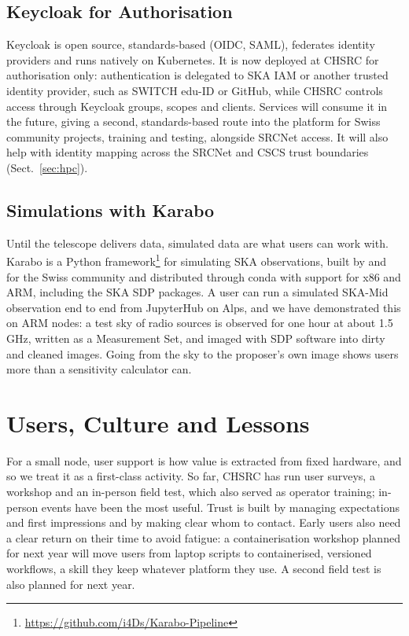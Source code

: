 \documentclass[11pt,twoside]{article}
\begin{document}
\subsection{Keycloak for Authorisation}
Keycloak is open source, standards-based (OIDC, SAML), federates identity providers and runs natively on Kubernetes. It is now deployed at CHSRC for authorisation only: authentication is delegated to SKA IAM or another trusted identity provider, such as SWITCH edu-ID or GitHub, while CHSRC controls access through Keycloak groups, scopes and clients. Services will consume it in the future, giving a second, standards-based route into the platform for Swiss community projects, training and testing, alongside SRCNet access. It will also help with identity mapping across the SRCNet and CSCS trust boundaries (Sect.~\ref{sec:hpc}).

\subsection{Simulations with Karabo}
Until the telescope delivers data, simulated data are what users can work with. Karabo \citep{2026A&C....5401004S} is a Python framework\footnote{\url{https://github.com/i4Ds/Karabo-Pipeline}} for simulating SKA observations, built by and for the Swiss community and distributed through conda with support for x86 and ARM, including the SKA SDP packages. A user can run a simulated SKA-Mid observation end to end from JupyterHub on Alps, and we have demonstrated this on ARM nodes: a test sky of radio sources is observed for one hour at about 1.5\,GHz, written as a Measurement Set, and imaged with SDP software into dirty and cleaned images. Going from the sky to the proposer's own image shows users more than a sensitivity calculator can.

\section{Users, Culture and Lessons}

For a small node, user support is how value is extracted from fixed hardware, and so we treat it as a first-class activity. So far, CHSRC has run user surveys, a workshop and an in-person field test, which also served as operator training; in-person events have been the most useful. Trust is built by managing expectations and first impressions and by making clear whom to contact. Early users also need a clear return on their time to avoid fatigue: a containerisation workshop planned for next year will move users from laptop scripts to containerised, versioned workflows, a skill they keep whatever platform they use. A second field test is also planned for next year.
\end{document}
